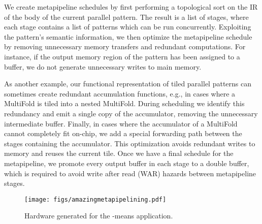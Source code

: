 \documentclass[pageno]{jpaper}
\begin{document}
We create metapipeline schedules by first performing a topological sort on the IR of the body of the current parallel pattern.
The result is a list of stages, where each stage contains a list of patterns which can be run concurrently.
Exploiting the pattern's semantic information, we then
optimize the metapipeline schedule by removing unnecessary memory transfers and redundant computations.
For instance, if the output memory region of the pattern has been assigned to a buffer,
we do not generate unnecessary writes to main memory.

As another example, our functional representation of tiled parallel patterns can sometimes create redundant accumulation functions,
e.g., in cases where a MultiFold is tiled into a nested MultiFold. During scheduling we identify
this redundancy and emit a single copy of the accumulator, removing the unnecessary intermediate buffer.
Finally, in cases where the accumulator of a MultiFold cannot completely fit on-chip, we add a special
forwarding path between the stages containing the accumulator. This optimization avoids redundant writes to memory and
reuses the current tile.
Once we have a final schedule for the metapipeline, we promote every output buffer in each stage
to a double buffer, which is required to avoid write after read (WAR) hazards between metapipeline stages.

\begin{figure*} \centering\texttt{[image: figs/amazingmetapipelining.pdf]}\caption{Hardware generated for the -means application.}
\label{fig:metapipelining}
\end{figure*}
\end{document}
